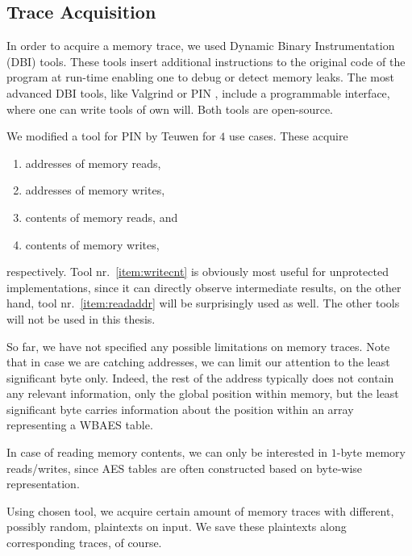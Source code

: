 \subsection{Trace Acquisition}
\label{sec:tracq}

In order to acquire a memory trace, we used Dynamic Binary Instrumentation (DBI) tools. These tools insert additional instructions to the original code of the program at run-time enabling one to debug or detect memory leaks. The most advanced DBI tools, like Valgrind \cite{nethercote2007valgrind} or PIN \cite{luk2005pin}, include a programmable interface, where one can write tools of own will. Both tools are open-source.

We modified a tool for PIN by Teuwen \cite{teuwen2015movfuscator} for $4$ use cases. These acquire
\begin{enumerate}
	\item addresses of memory reads, \label{item:readaddr}
	\item addresses of memory writes,
	\item contents of memory reads, and
	\item contents of memory writes, \label{item:writecnt}
\end{enumerate}
respectively. Tool nr.\ \ref{item:writecnt} is obviously most useful for unprotected implementations, since it can directly observe intermediate results, on the other hand, tool nr.\ \ref{item:readaddr} will be surprisingly used as well. The other tools will not be used in this thesis.

\begin{note}
\label{note:lsb}
	So far, we have not specified any possible limitations on memory traces. Note that in case we are catching addresses, we can limit our attention to the least significant byte only. Indeed, the rest of the address typically does not contain any relevant information, only the global position within memory, but the least significant byte carries information about the position within an array representing a WBAES table.
	
	In case of reading memory contents, we can only be interested in $1$-byte memory reads/writes, since AES tables are often constructed based on byte-wise representation.
\end{note}

Using chosen tool, we acquire certain amount of memory traces with different, possibly random, plaintexts on input. We save these plaintexts along corresponding traces, of course.

